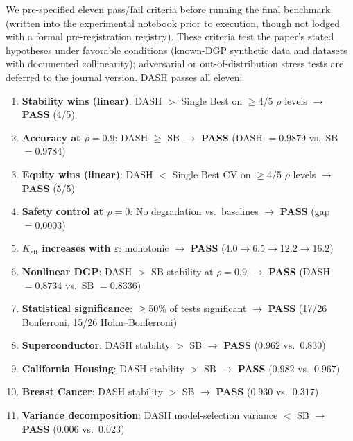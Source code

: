 \documentclass[11pt]{article}
\newcommand{\dash}{\textsc{DASH}}
\newcommand{\rhovar}{\rho}
\begin{document}
We pre-specified eleven pass/fail criteria before running the final
benchmark (written into the experimental notebook prior to execution,
though not lodged with a formal pre-registration registry). These criteria test the paper's stated hypotheses under
favorable conditions (known-DGP synthetic data and datasets with
documented collinearity); adversarial or out-of-distribution stress
tests are deferred to the journal version. \dash{} passes all eleven:

\begin{enumerate}
  \item \textbf{Stability wins (linear)}: DASH $>$ Single Best on $\geq$4/5
    $\rhovar$ levels $\to$ \textbf{PASS} (4/5)
  \item \textbf{Accuracy at $\rhovar = 0.9$}: DASH $\geq$ SB $\to$
    \textbf{PASS} (DASH $= 0.9879$ vs.\ SB $= 0.9784$)
  \item \textbf{Equity wins (linear)}: DASH $<$ Single Best CV on $\geq$4/5
    $\rhovar$ levels $\to$ \textbf{PASS} (5/5)
  \item \textbf{Safety control at $\rhovar = 0$}: No degradation vs.\
    baselines $\to$ \textbf{PASS} (gap $= 0.0003$)
  \item \textbf{$K_{\text{eff}}$ increases with $\varepsilon$}: monotonic
    $\to$ \textbf{PASS} ($4.0 \to 6.5 \to 12.2 \to 16.2$)
  \item \textbf{Nonlinear DGP}: DASH $>$ SB stability at $\rhovar = 0.9$
    $\to$ \textbf{PASS} (DASH $= 0.8734$ vs.\ SB $= 0.8336$)
  \item \textbf{Statistical significance}: $\geq$50\% of tests significant
    $\to$ \textbf{PASS} (17/26 Bonferroni, 15/26 Holm--Bonferroni)
  \item \textbf{Superconductor}: DASH stability $>$ SB $\to$ \textbf{PASS}
    ($0.962$ vs.\ $0.830$)
  \item \textbf{California Housing}: DASH stability $>$ SB $\to$ \textbf{PASS}
    ($0.982$ vs.\ $0.967$)
  \item \textbf{Breast Cancer}: DASH stability $>$ SB $\to$ \textbf{PASS}
    ($0.930$ vs.\ $0.317$)
  \item \textbf{Variance decomposition}: DASH model-selection variance $<$ SB
    $\to$ \textbf{PASS} ($0.006$ vs.\ $0.023$)
\end{enumerate}
\end{document}
